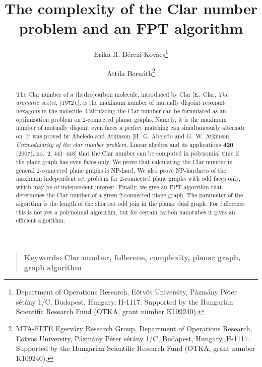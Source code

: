 \documentclass{article}
\begin{document}
\title{The complexity of the Clar number problem and an FPT algorithm} 
\author{Erika R. B\'erczi-Kov\'acs\thanks{Department of Operations Research, E\"otv\"os University, P\'azm\'any P\'eter s\'et\'any 1/C, Budapest, Hungary, H-1117.  Supported by  the Hungarian Scientific Research Fund (OTKA, grant number K109240).} 
\and 
Attila Bern\'ath\thanks{MTA-ELTE Egerv\'ary Research Group,
Department of Operations Research, E\"otv\"os University, P\'azm\'any P\'eter s\'et\'any 1/C, Budapest, Hungary, H-1117.  Supported by  the Hungarian Scientific Research Fund (OTKA, grant number K109240).}
}

\maketitle

\begin{abstract}
  The Clar number of a (hydro)carbon molecule, introduced by Clar
    [E.~Clar, \emph{The aromatic sextet}, (1972).], is the maximum
    number of mutually disjoint resonant hexagons in the molecule.
    Calculating the Clar number can be formulated as an optimization
    problem on 2-connected planar graphs.  Namely, it is the maximum
    number of mutually disjoint even faces a perfect matching can
    simultaneously alternate on.  It was proved by Abeledo and
    Atkinson [H.~G. Abeledo and G.~W. Atkinson, \emph{Unimodularity of
        the clar number problem}, Linear algebra and its applications
      \textbf{420} (2007), no.~2, 441--448] that the Clar number can
    be computed in polynomial time if the plane graph has even faces
    only.  We prove that calculating the Clar number in general
  2-connected plane graphs is NP-hard.  We also prove NP-hardness of
    the maximum independent set problem for 2-connected plane graphs
    with odd faces only, which may be of independent interest.
  Finally, we give an FPT algorithm that determines the
  Clar number of a given 2-connected plane graph.  The parameter of
  the algorithm is the length of the shortest odd join in the planar
  dual graph.  For fullerenes this is not yet a polynomial algorithm,
  but for certain carbon nanotubes it gives an efficient algorithm.
\end{abstract}

\begin{quote}
{\bf Keywords: Clar number, fullerene, complexity, planar graph, graph algorithm}
\end{quote}
\vspace{5mm}
\end{document}
